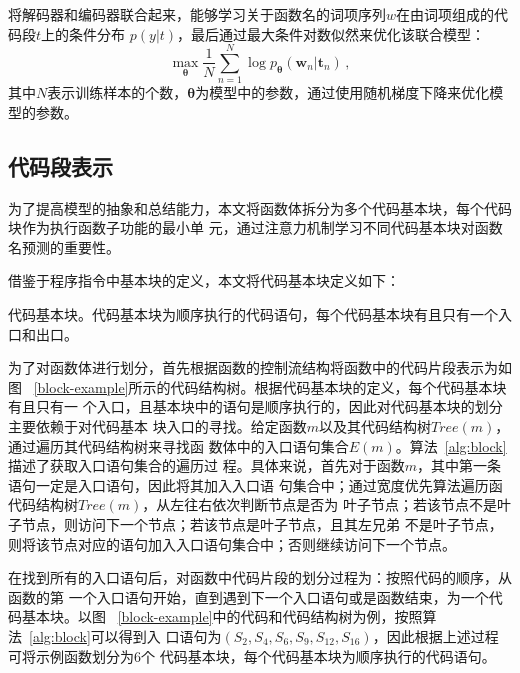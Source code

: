 将解码器和编码器联合起来，能够学习关于函数名的词项序列$w$在由词项组成的代码段$t$上的条件分布
$p(y|t)$，最后通过最大条件对数似然来优化该联合模型：
\begin{equation}
\max \limits_{\bm\theta} \frac{1}{N}\sum_{n=1}^{N} \log p_{\bm\theta}(\bm w_n | 
\bm t_n) \,,
\label{eq:loss}
\end{equation}
其中$N$表示训练样本的个数，$\bm\theta$为模型中的参数，通过使用随机梯度下降来优化模型的参数。

\subsection{代码段表示}
\label{represent}
为了提高模型的抽象和总结能力，本文将函数体拆分为多个代码基本块，每个代码块作为执行函数子功能的最小单
元，通过注意力机制学习不同代码基本块对函数名预测的重要性。

借鉴于程序指令中基本块的定义，本文将代码基本块定义如下：
\begin{Definition}
    代码基本块。代码基本块为顺序执行的代码语句，每个代码基本块有且只有一个入口和出口。
\end{Definition}

为了对函数体进行划分，首先根据函数的控制流结构将函数中的代码片段表示为如图
~\ref{block-example}所示的代码结构树。根据代码基本块的定义，每个代码基本块有且只有一
个入口，且基本块中的语句是顺序执行的，因此对代码基本块的划分主要依赖于对代码基本
块入口的寻找。给定函数$m$以及其代码结构树$Tree(m)$，通过遍历其代码结构树来寻找函
数体中的入口语句集合$E(m)$。算法~\ref{alg:block}描述了获取入口语句集合的遍历过
程。具体来说，首先对于函数$m$，其中第一条语句一定是入口语句，因此将其加入入口语
句集合中；通过宽度优先算法遍历函代码结构树$Tree(m)$，从左往右依次判断节点是否为
叶子节点；若该节点不是叶子节点，则访问下一个节点；若该节点是叶子节点，且其左兄弟
不是叶子节点，则将该节点对应的语句加入入口语句集合中；否则继续访问下一个节点。

在找到所有的入口语句后，对函数中代码片段的划分过程为：按照代码的顺序，从函数的第
一个入口语句开始，直到遇到下一个入口语句或是函数结束，为一个代码基本块。以图
~\ref{block-example}中的代码和代码结构树为例，按照算法~\ref{alg:block}可以得到入
口语句为$(S_2,S_4,S_6,S_9,S_{12},S_{16})$，因此根据上述过程可将示例函数划分为6个
代码基本块，每个代码基本块为顺序执行的代码语句。

